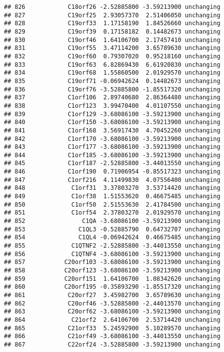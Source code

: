 \documentclass[]{article}
\begin{document}
\begin{verbatim}
## 826            C18orf26 -2.52885800 -3.59213900 unchanging
## 827            C19orf25  2.93057370  2.51406050 unchanging
## 828            C19orf33  1.17158190  1.84526660 unchanging
## 829            C19orf39  0.17158182  0.14482673 unchanging
## 830            C19orf46  1.64106700  2.17457410 unchanging
## 831            C19orf55  3.47114200  3.65789630 unchanging
## 832            C19orf60  0.79307020  0.95218160 unchanging
## 833            C19orf63  6.82869430  6.61920830 unchanging
## 834            C19orf68  1.55860500  2.01929570 unchanging
## 835            C19orf71 -0.06942624  0.14482673 unchanging
## 836            C19orf76 -3.52885800 -1.85517320 unchanging
## 837            C1orf106  2.89740680  2.86364480 unchanging
## 838            C1orf123  3.99470400  4.01107550 unchanging
## 839            C1orf129 -3.68086100 -3.59213900 unchanging
## 840            C1orf150 -3.68086100 -3.59213900 unchanging
## 841            C1orf168  3.56917430  4.70452260 unchanging
## 842            C1orf170 -3.68086100 -3.59213900 unchanging
## 843            C1orf177 -3.68086100 -3.59213900 unchanging
## 844            C1orf185 -3.68086100 -3.59213900 unchanging
## 845            C1orf187 -2.52885800 -3.44013550 unchanging
## 846            C1orf190  0.71906954 -0.85517323 unchanging
## 847            C1orf216  4.11499830  4.07556400 unchanging
## 848             C1orf31  3.37803270  3.53714420 unchanging
## 849             C1orf38  1.51553620  0.46675485 unchanging
## 850             C1orf50  2.51553630  2.41784500 unchanging
## 851             C1orf54  2.37803270  2.01929570 unchanging
## 852                C1QA -3.68086100 -3.59213900 unchanging
## 853               C1QL3 -0.52885790  0.64732707 unchanging
## 854               C1QL4 -0.06942624  0.46675485 unchanging
## 855             C1QTNF2 -2.52885800 -3.44013550 unchanging
## 856             C1QTNF4 -3.68086100 -3.59213900 unchanging
## 857           C20orf103 -3.68086100 -3.59213900 unchanging
## 858           C20orf123 -3.68086100 -3.59213900 unchanging
## 859           C20orf151  1.64106700  1.08342620 unchanging
## 860           C20orf195 -0.35893290 -1.85517320 unchanging
## 861            C20orf27  3.45982700  3.65789630 unchanging
## 862            C20orf46 -3.52885800 -2.44013570 unchanging
## 863            C20orf62 -3.68086100 -3.59213900 unchanging
## 864             C21orf2  2.64106700  2.53714420 unchanging
## 865            C21orf33  5.24592900  5.10289570 unchanging
## 866            C21orf49 -3.68086100 -3.44013550 unchanging
## 867            C22orf24 -3.52885800 -3.59213900 unchanging

\end{verbatim}
\end{document}
